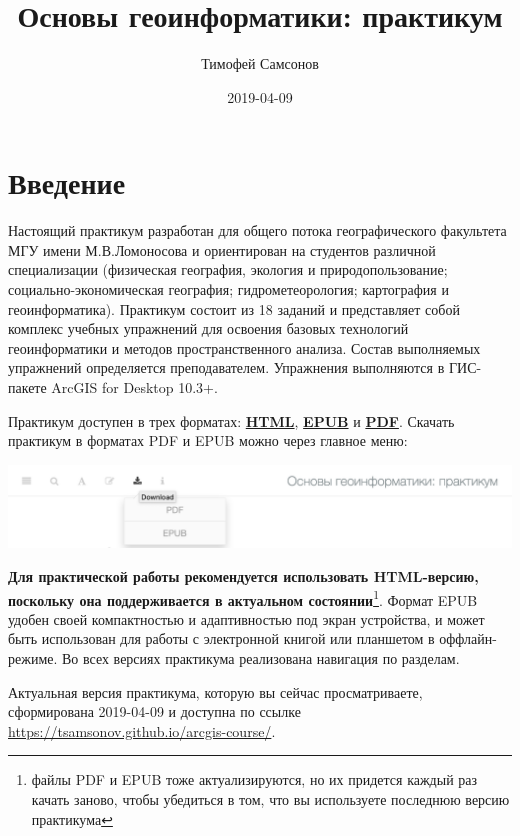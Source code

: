 \documentclass[12pt,]{book}
\title{Основы геоинформатики: практикум}
\author{Тимофей Самсонов}
\date{2019-04-09}
\let\rmarkdownfootnote\footnote%
\def\footnote{\protect\rmarkdownfootnote}
\begin{document}
\maketitle

{
\hypersetup{linkcolor=black}
\setcounter{tocdepth}{1}
\tableofcontents
}
\hypertarget{section}{%
\chapter*{Введение}\label{section}}

Настоящий практикум разработан для общего потока географического факультета МГУ имени М.В.Ломоносова и ориентирован на студентов различной специализации (физическая география, экология и природопользование; социально-экономическая география; гидрометеорология; картография и геоинформатика). Практикум состоит из 18 заданий и представляет собой комплекс учебных упражнений для освоения базовых технологий геоинформатики и методов пространственного анализа. Состав выполняемых упражнений определяется преподавателем. Упражнения выполняются в ГИС-пакете ArcGIS for Desktop 10.3+.

Практикум доступен в трех форматах: \href{https://tsamsonov.github.io/arcgis-course/}{\textbf{HTML}}, \href{https://tsamsonov.github.io/arcgis-course/arcgis-course.epub}{\textbf{EPUB}} и \href{https://tsamsonov.github.io/arcgis-course/arcgis-course.pdf}{\textbf{PDF}}. Скачать практикум в форматах PDF и EPUB можно через главное меню:

\includegraphics{images/download.png}

\textbf{Для практической работы рекомендуется использовать HTML-версию, поскольку она поддерживается в актуальном состоянии}\footnote{файлы PDF и EPUB тоже актуализируются, но их придется каждый раз качать заново, чтобы убедиться в том, что вы используете последнюю версию практикума}. Формат EPUB удобен своей компактностью и адаптивностью под экран устройства, и может быть использован для работы с электронной книгой или планшетом в оффлайн-режиме. Во всех версиях практикума реализована навигация по разделам.

Актуальная версия практикума, которую вы сейчас просматриваете, сформирована 2019-04-09 и доступна по ссылке \url{https://tsamsonov.github.io/arcgis-course/}.
\end{document}
